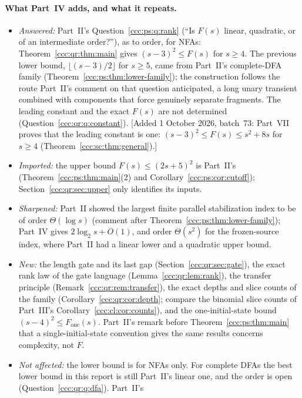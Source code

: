 \documentclass[11pt,letterpaper]{article}
\theoremstyle{definition}
\theoremstyle{remark}
\newcommand{\waddsevthree}[1]{\textup{[}Added 1 October 2026, batch~73: #1\textup{]}}
\begin{document}
\paragraph{What Part~IV adds, and what it repeats.}
\begin{itemize}[leftmargin=1.4em,itemsep=1pt]
\item \emph{Answered:} Part~II's Question~\ref{ccc:ps:q:rank} (``Is $F(s)$
 linear, quadratic, or of an intermediate order?''), as to order, for NFAs:
 Theorem~\ref{ccc:qr:thm:main} gives $(s-3)^2\le F(s)$ for $s\ge4$. The
 previous lower bound, $\lfloor(s-3)/2\rfloor$ for $s\ge5$, came from
 Part~II's complete-DFA family (Theorem~\ref{ccc:ps:thm:lower-family}); the
 construction follows the route Part~II's comment on that question
 anticipated, a long unary transient combined with components that force
 genuinely separate fragments. The leading constant and the exact $F(s)$ are
 not determined (Question~\ref{ccc:qr:q:constant}).
 \waddsevthree{Part~VII proves that the leading constant is one: $(s-3)^2\le F(s)\le s^2+8s$ for $s\ge4$ (Theorem~\ref{ccc:sc:thm:general}).}
\item \emph{Imported:} the upper bound $F(s)\le(2s+5)^2$ is Part~II's
 (Theorem~\ref{ccc:ps:thm:main}(2) and Corollary~\ref{ccc:ps:cor:cutoff});
 Section~\ref{ccc:qr:sec:upper} only identifies its inputs.
\item \emph{Sharpened:} Part~II showed the largest finite parallel
 stabilization index to be of order $\Theta(\log s)$ (comment after
 Theorem~\ref{ccc:ps:thm:lower-family}); Part~IV gives $2\log_2s+O(1)$, and
 order $\Theta(s^2)$ for the frozen-source index, where Part~II had a linear
 lower and a quadratic upper bound.
\item \emph{New:} the length gate and its last gap
 (Section~\ref{ccc:qr:sec:gate}), the exact rank law of the gate language
 (Lemma~\ref{ccc:qr:lem:rank}), the transfer principle
 (Remark~\ref{ccc:qr:rem:transfer}), the exact depths and slice counts of the
 family (Corollary~\ref{ccc:qr:cor:depth}; compare the binomial slice counts of
 Part~III's Corollary~\ref{ccc:cl:cor:counts}), and the
 one-initial-state bound $(s-4)^2\le F_{\mathrm{one}}(s)$. Part~II's remark
 before Theorem~\ref{ccc:ps:thm:main} that a single-initial-state convention
 gives the same results concerns complexity, not $F$.
\item \emph{Not affected:} the lower bound is for NFAs only. For complete DFAs
 the best lower bound in this report is still Part~II's linear one, and the
 order is open (Question~\ref{ccc:qr:q:dfa}). Part~II's

\end{itemize}
\end{document}
